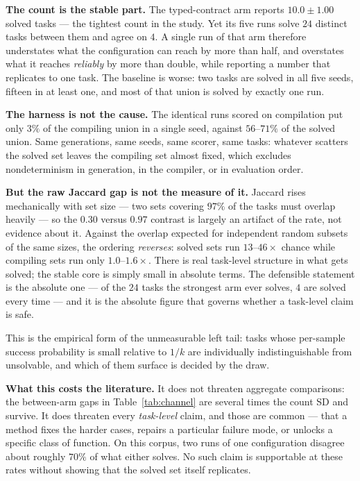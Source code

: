 \documentclass[conference]{IEEEtran}
\begin{document}
\textbf{The count is the stable part.} The typed-contract arm reports
$10.0\pm1.00$ solved tasks --- the tightest count in the study. Yet its five runs
solve $24$ distinct tasks between them and agree on $4$. A single run of that arm
therefore understates what the configuration can reach by more than half, and
overstates what it reaches \emph{reliably} by more than double, while reporting a
number that replicates to one task. The baseline is worse: two tasks are solved
in all five seeds, fifteen in at least one, and most of that union is solved by
exactly one run.

\textbf{The harness is not the cause.} The identical runs scored on compilation
put only $3\%$ of the compiling union in a single seed, against $56$--$71\%$ of
the solved union. Same generations, same seeds, same scorer, same tasks: whatever
scatters the solved set leaves the compiling set almost fixed, which excludes
nondeterminism in generation, in the compiler, or in evaluation order.

\textbf{But the raw Jaccard gap is not the measure of it.} Jaccard rises
mechanically with set size --- two sets covering $97\%$ of the tasks must overlap
heavily --- so the $0.30$ versus $0.97$ contrast is largely an artifact of the
rate, not evidence about it. Against the overlap expected for independent random
subsets of the same sizes, the ordering \emph{reverses}: solved sets run
$13$--$46{\times}$ chance while compiling sets run only $1.0$--$1.6{\times}$.
There is real task-level structure in what gets solved; the stable core is simply
small in absolute terms. The defensible statement is the absolute one --- of the
$24$ tasks the strongest arm ever solves, $4$ are solved every time --- and it is
the absolute figure that governs whether a task-level claim is safe.

This is the empirical form of the unmeasurable left tail: tasks whose per-sample
success probability is small relative to $1/k$ are individually indistinguishable
from unsolvable, and which of them surface is decided by the draw.

\textbf{What this costs the literature.} It does not threaten aggregate
comparisons: the between-arm gaps in Table~\ref{tab:channel} are several times
the count SD and survive. It does threaten every \emph{task-level} claim, and
those are common --- that a method fixes the harder cases, repairs a particular
failure mode, or unlocks a specific class of function. On this corpus, two runs
of one configuration disagree about roughly $70\%$ of what either solves. No such
claim is supportable at these rates without showing that the solved set itself
replicates.
\end{document}
